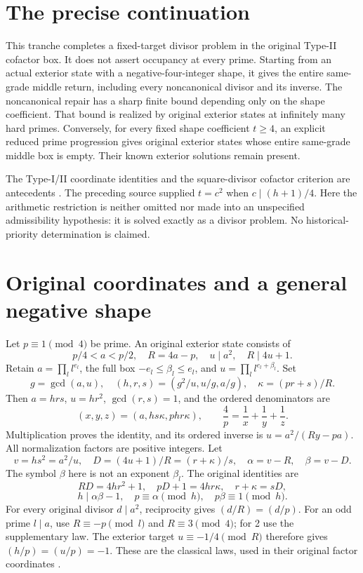 \section{The precise continuation}
This tranche completes a fixed-target divisor problem in the original Type-II
cofactor box. It does not assert occupancy at every prime. Starting from an
actual exterior state with a negative-four-integer shape, it gives the entire
same-grade middle return, including every noncanonical divisor and its inverse.
The noncanonical repair has a sharp finite bound depending only on the shape
coefficient. That bound is realized by original exterior states at infinitely
many hard primes. Conversely, for every fixed shape coefficient $t\ge4$, an
explicit reduced prime progression gives original exterior states whose entire
same-grade middle box is empty. Their known exterior solutions remain present.

The Type-I/II coordinate identities and the square-divisor cofactor criterion
are antecedents \cite[\S2, Propositions 2.2 and 2.6]{ET}. The preceding source
\cite[negative-four-square transfer]{Parent} supplied $t=c^2$ when
$c\mid(h+1)/4$. Here the arithmetic restriction is neither omitted nor made into
an unspecified admissibility hypothesis: it is solved exactly as a divisor
problem. No historical-priority determination is claimed.

\section{Original coordinates and a general negative shape}
Let $p\equiv1\pmod4$ be prime. An original exterior state consists of
\[
 p/4<a<p/2,\quad R=4a-p,\quad u\mid a^2,\quad R\mid4u+1.
\]
Retain $a=\prod_l l^{e_l}$, the full box $-e_l\le\beta_l\le e_l$, and
$u=\prod_l l^{e_l+\beta_l}$. Set
\[
 g=\gcd(a,u),\quad (h,r,s)=(g^2/u,u/g,a/g),\quad
 \kappa=(pr+s)/R.
\]
Then $a=hrs$, $u=hr^2$, $\gcd(r,s)=1$, and the ordered denominators are
\[
 (x,y,z)=(a,hs\kappa,phr\kappa),\qquad
 \frac4p=\frac1x+\frac1y+\frac1z.                         \tag{1}
\]
Multiplication proves the identity, and its ordered inverse is
$u=a^2/(Ry-pa)$. All normalization factors are positive integers. Let
\[
 v=hs^2=a^2/u,\quad D=(4u+1)/R=(r+\kappa)/s,
 \quad \alpha=v-R,\quad\beta=v-D.
\]
The symbol $\beta$ here is not an exponent $\beta_l$. The original identities are
\[
 RD=4hr^2+1,\quad pD+1=4hr\kappa,\quad r+\kappa=sD,
\]
\[
 h\mid\alpha\beta-1,\quad p\equiv\alpha\pmod h,
 \quad p\beta\equiv1\pmod h.                             \tag{2}
\]
For every original divisor $d\mid a^2$, reciprocity gives $(d/R)=(d/p)$.
For an odd prime $l\mid a$, use $R\equiv-p\pmod l$ and $R\equiv3\pmod4$;
for 2 use the supplementary law. The exterior target $u\equiv-1/4\pmod R$
therefore gives $(h/p)=(u/p)=-1$. These are the classical laws, used in their
original factor coordinates \cite[\S6.4]{Hatcher}.


